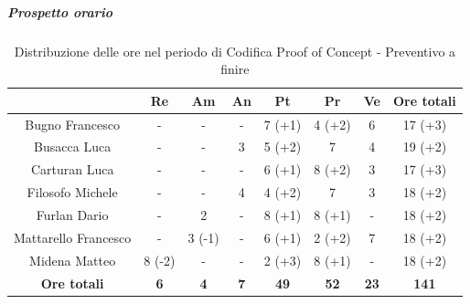 \subparagraph{Prospetto orario} \label{subparagraph:prospetto_orario_PoC}
\begin{table}[H]
  \centering
  \renewcommand{\arraystretch}{1.8}
  \begin{tabular}{c|c|c|c|c|c|c|c}
    \rowcolor[HTML]{125E28}
    \multicolumn{1}{c}{\color[HTML]{FFFFFF}\textbf{ Nominativo }}
                         & \multicolumn{1}{c}{\color[HTML]{FFFFFF}\textbf{ Re }}
                         & \multicolumn{1}{c}{\color[HTML]{FFFFFF}\textbf{ Am}}
                         & \multicolumn{1}{c}{\color[HTML]{FFFFFF}\textbf{ An }}
                         & \multicolumn{1}{c}{\color[HTML]{FFFFFF}\textbf{ Pt }}
                         & \multicolumn{1}{c}{\color[HTML]{FFFFFF}\textbf{ Pr }}
                         & \multicolumn{1}{c}{\color[HTML]{FFFFFF}\textbf{ Ve }}
                         & \multicolumn{1}{c}{\color[HTML]{FFFFFF}\textbf{ Ore totali }}                                                                                    \\
    \hline
    Bugno Francesco      & -                                                             & -          & -          & 7 (+1)      & 4 (+2)      & 6           & 17 (+3)      \\
    Busacca Luca         & -                                                             & -          & 3          & 5 (+2)      & 7           & 4           & 19 (+2)      \\
    Carturan Luca        & -                                                             & -          & -          & 6 (+1)      & 8 (+2)      & 3           & 17 (+3)      \\
    Filosofo Michele     & -                                                             & -          & 4          & 4 (+2)      & 7           & 3           & 18 (+2)      \\
    Furlan Dario         & -                                                             & 2          & -          & 8 (+1)      & 8 (+1)      & -           & 18 (+2)      \\
    Mattarello Francesco & -                                                             & 3 (-1)     & -          & 6 (+1)      & 2 (+2)      & 7           & 18 (+2)      \\
    Midena Matteo        & 8 (-2)                                                        & -          & -          & 2 (+3)      & 8 (+1)      & -           & 18 (+2)      \\
    \textbf{Ore totali}  & \textbf{6}                                                    & \textbf{4} & \textbf{7} & \textbf{49} & \textbf{52} & \textbf{23} & \textbf{141}
  \end{tabular}
  \caption{Distribuzione delle ore nel periodo di Codifica Proof of Concept - Preventivo a finire}
\end{table}

